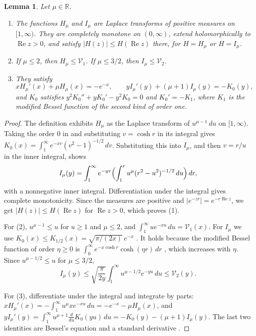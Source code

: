 \documentclass[11pt]{amsart}
\numberwithin{equation}{section}
\newtheorem{lemma}[equation]{Lemma}
\theoremstyle{definition}
\theoremstyle{remark}
\newcommand{\R}{\mathbb R}
\begin{document}
\begin{lemma}\label{an:kernels}
Let $\mu\in\R$.
\begin{enumerate}
\item The functions $H_\mu$ and $I_\mu$ are Laplace transforms of positive
 measures on $[1,\infty)$. They are completely monotone on $(0,\infty)$,
 extend holomorphically to $\operatorname{Re}z>0$, and satisfy
 $|H(z)|\le H(\operatorname{Re}z)$ there, for $H=H_\mu$ or $H=I_\mu$.
\item If $\mu\le2$, then $H_\mu\le\mathcal V_1$. If $\mu\le3/2$, then
 $I_\mu\le\mathcal V_2$.
\item They satisfy
 \[
 xH_\mu'(x)+\mu H_\mu(x)=-e^{-x},\qquad
 yI_\mu'(y)+(\mu+1)I_\mu(y)=-K_0(y),
 \]
 and $K_0$ satisfies $y^2K_0''+yK_0'-y^2K_0=0$ and $K_0'=-K_1$, where
 $K_1$ is the modified Bessel function of the second kind of order one.
\end{enumerate}
\end{lemma}

\begin{proof}
The definition exhibits $H_\mu$ as the Laplace transform of
$u^{\mu-1}\,du$ on $[1,\infty)$. Taking the order $0$ in
\cite[10.32.9]{DLMF} and substituting $v=\cosh r$ in its integral gives
$K_0(x)=\int_1^\infty e^{-xv}(v^2-1)^{-1/2}\,dv$. Substituting this into
$I_\mu$, and then $v=r/u$ in the inner integral, shows
\[
 I_\mu(y)=\int_1^\infty e^{-yr}\Bigl(\int_1^ru^\mu(r^2-u^2)^{-1/2}\,du\Bigr)
 \,dr,
\]
with a nonnegative inner integral. Differentiation under the integral
gives complete monotonicity. Since the measures are positive and
$|e^{-zr}|=e^{-r\operatorname{Re}z}$, we get $|H(z)|\le H(\operatorname{Re}z)$
for $\operatorname{Re}z>0$, which proves (1).

For (2), $u^{\mu-1}\le u$ for $u\ge1$ and $\mu\le2$, and
$\int_1^\infty ue^{-xu}\,du=\mathcal V_1(x)$. For $I_\mu$ we use
$K_0(x)\le K_{1/2}(x)=\sqrt{\pi/(2x)}\,e^{-x}$ \cite[10.39.2]{DLMF}. It
holds because the modified Bessel function of order $\eta\ge0$ is
$\int_0^\infty e^{-x\cosh r}\cosh(\eta r)\,dr$ \cite[10.32.9]{DLMF}, which
increases with $\eta$. Since $u^{\mu-1/2}\le u$ for $\mu\le3/2$,
\[
 I_\mu(y)\le\sqrt{\frac\pi{2y}}\int_1^\infty u^{\mu-1/2}e^{-yu}\,du
 \le\mathcal V_2(y).
\]

For (3), differentiate under the integral and integrate by parts:
$xH_\mu'(x)=-\int_1^\infty u^\mu xe^{-xu}\,du=-e^{-x}-\mu H_\mu(x)$, and
$yI_\mu'(y)=\int_1^\infty u^{\mu+1}\frac{d}{du}K_0(yu)\,du
=-K_0(y)-(\mu+1)I_\mu(y)$. The last two identities are Bessel's equation
and a standard derivative \cite[10.25.1, 10.29.3]{DLMF}.
\end{proof}
\end{document}
